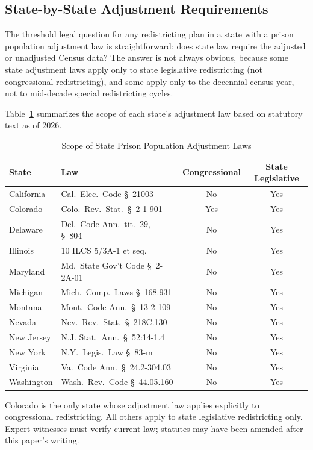\label{sec:legal}

\subsection{State-by-State Adjustment Requirements}

The threshold legal question for any redistricting plan in a state
with a prison population adjustment law is straightforward: does state
law require the adjusted or unadjusted Census data? The answer is
not always obvious, because some state adjustment laws apply only to
state legislative redistricting (not congressional redistricting),
and some apply only to the decennial census year, not to mid-decade
special redistricting cycles.

Table~\ref{tab:state-requirements} summarizes the scope of each state's
adjustment law based on statutory text as of 2026.

\begin{table}[ht]
\centering
\caption{Scope of State Prison Population Adjustment Laws}
\label{tab:state-requirements}
\begin{tabular}{llcc}
\toprule
State & Law & Congressional & State Legislative \\
\midrule
California & Cal.\ Elec.\ Code \S\ 21003 & No & Yes \\
Colorado & Colo.\ Rev.\ Stat.\ \S\ 2-1-901 & Yes & Yes \\
Delaware & Del.\ Code Ann.\ tit.\ 29, \S\ 804 & No & Yes \\
Illinois & 10 ILCS 5/3A-1 et seq. & No & Yes \\
Maryland & Md.\ State Gov't Code \S\ 2-2A-01 & No & Yes \\
Michigan & Mich.\ Comp.\ Laws \S\ 168.931 & No & Yes \\
Montana & Mont.\ Code Ann.\ \S\ 13-2-109 & No & Yes \\
Nevada & Nev.\ Rev.\ Stat.\ \S\ 218C.130 & No & Yes \\
New Jersey & N.J. Stat.\ Ann.\ \S\ 52:14-1.4 & No & Yes \\
New York & N.Y.\ Legis.\ Law \S\ 83-m & No & Yes \\
Virginia & Va.\ Code Ann.\ \S\ 24.2-304.03 & No & Yes \\
Washington & Wash.\ Rev.\ Code \S\ 44.05.160 & No & Yes \\
\bottomrule
\end{tabular}
\begin{tablenotes}
\small
\item Colorado is the only state whose adjustment law applies explicitly
to congressional redistricting. All others apply to state legislative
redistricting only. Expert witnesses must verify current law; statutes
may have been amended after this paper's writing.
\end{tablenotes}
\end{table}

